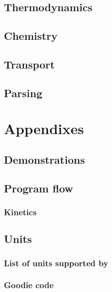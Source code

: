 \documentclass{documentation}
\begin{document}
\chapter{Thermodynamics}

\chapter{Chemistry}


\chapter{Transport}


\chapter{Parsing}


\appendix
\part{Appendixes}
\chapter{Demonstrations}
\label{demo}


\chapter{Program flow}
\label{progflow}

\section{Kinetics}
\label{progflow:kinetics}


\chapter{Units}
\section{List of units supported by \Antioch}
\label{list_units}


\section{Goodie code}
\label{unit_goodie}
{\footnotesize

}



\end{document}
